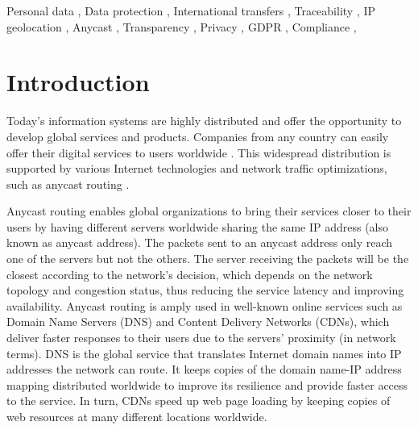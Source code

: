 \documentclass[preprint,12pt]{elsarticle}
\begin{document}
\begin{frontmatter}


\begin{keyword}
Personal data \sep 
Data protection \sep 
International transfers \sep 
Traceability \sep 
IP geolocation \sep 
Anycast \sep
Transparency \sep
Privacy \sep
GDPR \sep
Compliance \sep


\end{keyword}

\end{frontmatter}


\section{Introduction}
Today's information systems are highly distributed and offer the opportunity to develop global services and products. Companies from any country can easily offer their digital services to users worldwide \cite{Razaghpanah2018AppsEcosystem}. This widespread distribution is supported by various Internet technologies and network traffic optimizations, such as anycast routing \cite{Abley2006OperationServices, McPherson2014ArchitecturalAnycast}. 

Anycast routing enables global organizations to bring their services closer to their users by having different servers worldwide sharing the same IP address (also known as anycast address). The packets sent to an anycast address only reach one of the servers but not the others. The server receiving the packets will be the closest according to the network's decision, which depends on the network topology and congestion status, thus reducing the service latency and improving availability. Anycast routing is amply used in well-known online services such as Domain Name Servers (DNS) and Content Delivery Networks (CDNs), which deliver faster responses to their users due to the servers' proximity (in network terms). DNS is the global service that translates Internet domain names into IP addresses the network can route. It keeps copies of the domain name-IP address mapping distributed worldwide to improve its resilience and provide faster access to the service. In turn, CDNs speed up web page loading by keeping copies of web resources at many different locations worldwide. 
\end{document}
